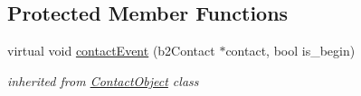 \subsection*{Protected Member Functions}
\begin{DoxyCompactItemize}
\item 
\mbox{\label{class_sensor_a3445be09d7e8905b1d8e46f2e0306542}} 
virtual void \hyperlink{class_sensor_a3445be09d7e8905b1d8e46f2e0306542}{contact\+Event} (b2\+Contact $\ast$contact, bool is\+\_\+begin)
\begin{DoxyCompactList}\small\item\em inherited from \hyperlink{class_contact_object}{Contact\+Object} class \end{DoxyCompactList}\end{DoxyCompactItemize}
